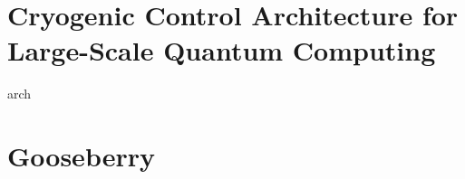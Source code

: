 \clearpage
\section{Cryogenic Control Architecture for Large-Scale Quantum Computing}
\label{sec:primelines}
{arch}

\clearpage
\section{Gooseberry}
\label{sec:gooseberry}
